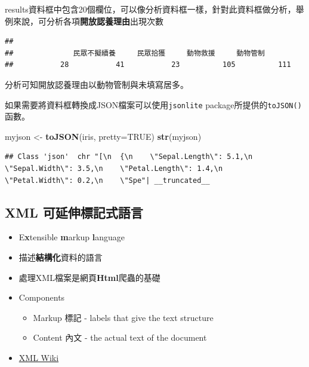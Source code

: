 \documentclass[]{book}
\newenvironment{Shaded}{\begin{snugshade}}{\end{snugshade}}
\newcommand{\KeywordTok}[1]{\textcolor[rgb]{0.13,0.29,0.53}{\textbf{{#1}}}}
\newcommand{\DataTypeTok}[1]{\textcolor[rgb]{0.13,0.29,0.53}{{#1}}}
\newcommand{\StringTok}[1]{\textcolor[rgb]{0.31,0.60,0.02}{{#1}}}
\newcommand{\OtherTok}[1]{\textcolor[rgb]{0.56,0.35,0.01}{{#1}}}
\newcommand{\NormalTok}[1]{{#1}}
\providecommand{\tightlist}{%
  \setlength{\itemsep}{0pt}\setlength{\parskip}{0pt}}
\theoremstyle{definition}
\theoremstyle{definition}
\theoremstyle{remark}
\begin{document}
results資料框中包含20個欄位，可以像分析資料框一樣，針對此資料框做分析，舉例來說，可分析各項\textbf{開放認養理由}出現次數

\begin{Shaded}
\end{Shaded}

\begin{verbatim}
## 
##              民眾不擬續養     民眾拾獲     動物救援     動物管制 
##           28           41           23          105          111
\end{verbatim}

分析可知開放認養理由以動物管制與未填寫居多。

如果需要將資料框轉換成JSON檔案可以使用\texttt{jsonlite}
package所提供的\texttt{toJSON()}函數。

\begin{Shaded}
\begin{Highlighting}[]
\NormalTok{myjson <-}\StringTok{ }\KeywordTok{toJSON}\NormalTok{(iris, }\DataTypeTok{pretty=}\OtherTok{TRUE}\NormalTok{)}
\KeywordTok{str}\NormalTok{(myjson)}
\end{Highlighting}
\end{Shaded}

\begin{verbatim}
## Class 'json'  chr "[\n  {\n    \"Sepal.Length\": 5.1,\n    \"Sepal.Width\": 3.5,\n    \"Petal.Length\": 1.4,\n    \"Petal.Width\": 0.2,\n    \"Spe"| __truncated__
\end{verbatim}

\subsection{XML 可延伸標記式語言}\label{xml}

\begin{itemize}
\tightlist
\item
  E\textbf{x}tensible \textbf{m}arkup \textbf{l}anguage
\item
  描述\textbf{結構化}資料的語言
\item
  處理XML檔案是網頁\textbf{Html}爬蟲的基礎
\item
  Components

  \begin{itemize}
  \tightlist
  \item
    Markup 標記 - labels that give the text structure
  \item
    Content 內文 - the actual text of the document
  \end{itemize}
\item
  \href{https://zh.wikipedia.org/wiki/XML}{XML Wiki}
\end{itemize}
\end{document}
